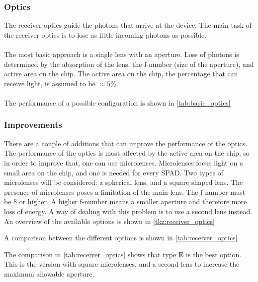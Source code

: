 \subsubsection{Optics}
The receiver optics guide the photons that arrive at the device. The main task of the receiver optics is to lose as little incoming photons as possible. \\
\\
The most basic approach is a single lens with an aperture. Loss of photons is determined by the absorption of the lens, the f-number (size of the aperture), and active area on the chip. The active area on the chip, the percentage that can receive light, is assumed to be $\approx 5\%$. \\
\\
The performance of a possible configuration is shown in \cref{tab:basic_optics}



\subsubsection*{Improvements}
There are a couple of additions that can improve the performance of the optics. The performance of the optics is most affected by the active area on the chip, so in order to improve that, one can use microlenses. Microlenses focus light on a small area on the chip, and one is needed for every SPAD. Two types of microlenses will be considered: a spherical lens, and a square shaped lens. The presence of microlenses poses a limitation of the main lens. The f-number must be 8 or higher. A higher f-number means a smaller aperture and therefore more loss of energy. A way of dealing with this problem is to use a second lens instead. An overview of the available options is shown in \cref{tkz:receiver_optics}



A comparison between the different options is shown in \cref{tab:receiver_optics}



The comparison in \cref{tab:receiver_optics} shows that type \textbf{E} is the best option. This is the version with square microlenses, and a second lens to increase the maximum allowable aperture. 